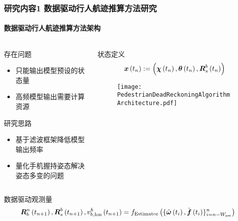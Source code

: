 \begin{frame}[t]
	\frametitle{研究内容1 数据驱动行人航迹推算方法研究}	
	\framesubtitle{数据驱动行人航迹推算方法架构}
	\vspace{-1cm}
	\begin{columns}[t]
		\begin{column}{0.5\textwidth}
		    \begin{block}{存在问题}
		    {
		    	\small
		        \begin{itemize}
					\item 只能输出模型预设的状态量
					\item 高频模型输出需要计算资源
		        \end{itemize}
    		 } 
			\end{block}
			\begin{block}{研究思路}
			 {
 		    	\small
				\begin{itemize}
					\item 基于滤波框架降低模型输出频率
					\item 量化手机握持姿态解决姿态多变的问题
				\end{itemize}
			}
			\end{block}
		\end{column}   
		\begin{column}{0.5\textwidth}
		    \begin{block}{状态定义}
      		{
  		    	\small
				\begin{equation*}
				   	\vb*{x}\left(t_n\right) := \left( \vb*{\chi}\left(t_n\right), \vb*{\theta}\left(t_n\right), \vb*{R}_s^b\left(t_n\right)\right) 
				\end{equation*}
			}
			\end{block}
			\begin{figure}
				\centering
				\texttt{[image: PedestrianDeadReckoningAlgorithmArchitecture.pdf]}
			\end{figure}
		\end{column}
	\end{columns} 
	\begin{block}{数据驱动观测量}
		\begin{equation*}
			\vb*{R}_{b}^{n}\left(t_{n+1}\right), \vb*{R}_{s}^{b}\left(t_{n+1}\right),v^{b}_{b, \mathrm{lon}}\left(t_{n+1}\right)
			=
			f_{\mathrm{Estimator}}\left(\{\tilde{\vb*{\omega}}\left(t_i\right), \tilde{\vb*{f}}\left(t_i\right)\}_{i = n-W_{\mathrm{est}}}^{n}\right)
		\end{equation*}
	\end{block}
\end{frame}

